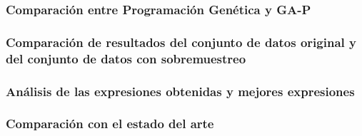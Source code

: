 \subsubsection{Comparación entre Programación Genética y GA-P}

\subsubsection{Comparación de resultados del conjunto de datos original y del conjunto de datos con sobremuestreo}

\subsubsection{Análisis de las expresiones obtenidas y mejores expresiones}

\subsubsection{Comparación con el estado del arte}




\newpage
